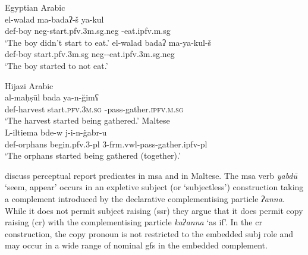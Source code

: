 \documentclass[output=paper,hidelinks]{langscibook}
\begin{document}
\ea \label{eca-ph} Egyptian Arabic  \citep[17]{AACES:LFG13}\\
\ea \label{neg1}
\gll el-walad ma-badaʔ-š  ya-kul \\
{\sc def-}boy {\sc neg}-start.{\sc pfv.3m.sg.neg} {}-eat.{\sc ipfv.m.sg}  \\
\glt `The boy didn't start to eat.'
\ex \label{neg2}
\gll el-walad bada{ʔ} ma-ya-kul-š \\
{\sc def-}boy start.{\sc pfv.3m.sg} {\sc neg}-{}-eat.{\sc ipfv.3m.sg.neg}  \\
\glt `The boy started to  not eat.'
\z\z

\newpage


\ea \label{ha-mtall}
\ea \label{ha-mt}  Hijazi Arabic  \citep[20]{AACES:LFG13}\\
\gll al-maḥṣ\={u}l bada ya-n-{\u{g}}imʕ\\
{\sc def}-harvest start.\textsc{pfv.3m.sg} {}-{\sc pass}-gather.\textsc{ipfv.m.sg} \\
\glt `The harvest started being gathered.'
\ex \label {mt-ph}  Maltese \citep[20]{AACES:LFG13}\\
\gll L-iltiema bde-w j-i-n-\.{g}abr-u\\
{\sc def}-orphans begin.{\sc pfv}.3-{\sc pl} 3-{\sc frm.vwl-pass}-gather.{\sc ipfv-pl}\\
\glt `The orphans started being gathered (together).'
\z\z








\citet{CES:LFG14} discuss  perceptual report predicates  in {\sc msa} and in Maltese. The {\sc msa} verb  {\em yabd\={u}}  `seem, appear' occurs in an expletive subject (or `subjectless')  construction taking a complement introduced by the declarative complementising particle {\em {ʔ}anna}.  While it does not  permit subject raising ({\sc ssr}) they argue that it  does permit copy raising ({\sc cr}) with the complementising particle {\em ka{ʔ}anna} `as if'.  In the {\sc cr} construction, the copy pronoun is not restricted to the embedded {\sc subj} role and  may occur in a wide range of nominal {\sc gf}s in the embedded complement.
\end{document}

